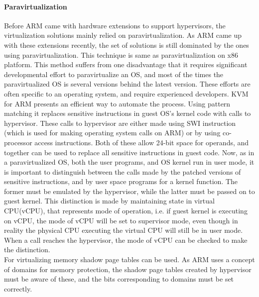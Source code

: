 \documentclass[a4paper,10pt]{article}
\begin{document}
  
  
  \paragraph{Paravirtualization}
  
  Before ARM came with hardware extensions to support hypervisors, the virtualization solutions mainly relied on paravirtualization. As ARM came up with these 
  extensions recently, the set of solutions is still dominated by the ones using paravirtualization. This technique is same as paravirtualization
  on x86 platform. This method suffers from one disadvantage that it requires significant developmental effort to paravirtualize an OS, and most of the times the
  paravirtualized OS is several versions behind the latest version. These efforts are often specific to an operating system, and require experienced developers.
  KVM for ARM \cite{KVM-for-ARM} presents an efficient way to automate the process. Using pattern matching it replaces sensitive instructions in guest OS's kernel
  code with calls to hypervisor. These calls to hypervisor are either made using SWI instruction (which is used for making operating system calls on ARM) or by using co-processor
  access instructions. Both of these allow 24-bit space for operands, and together can be used to replace all sensitive instructions in guest code.
  Now, as in a paravirtualized OS, both the user programs, and OS kernel run in user mode, it is important to distinguish between the calls made by the patched versions of
  sensitive instructions, and by user space programs for a kernel function. The former must be emulated by the hypervisor, while the latter must be passed on to
  guest kernel. This distinction is made by maintaining state in virtual CPU(vCPU), that represents mode of operation, i.e. if guest kernel is executing on vCPU, the mode
  of vCPU will be set to supervisor mode, even though in reality the physical CPU executing the virtual CPU will still be in user mode. When a call reaches the
  hypervisor, the mode of vCPU can be checked to make the distinction.
  \\
  For virtualizing memory shadow page tables can be used. As ARM uses a concept of domains for memory protection, the shadow page tables created by hypervisor must be aware
  of these, and the bits corresponding to domains must be set correctly.
  
\end{document}
